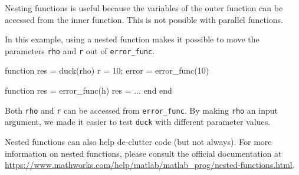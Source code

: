 \documentclass[
]{book}
\numberwithin{Answer}{chapter}
\numberwithin{Exercise}{chapter}
\begin{document}
\begin{appendices}
Nesting functions is useful because the variables of the outer
function can be accessed from the inner function.  This is not
possible with parallel functions.

In this example, using a nested function makes it possible to
move the parameters {\tt rho} and {\tt r} out of {\tt error\_func}.

\begin{code}
function res = duck(rho)
    r = 10;
    error = error_func(10)

    function res = error_func(h)
        res = ...
    end
end
\end{code}

Both {\tt rho} and {\tt r} can be accessed from {\tt error\_func}.
By making {\tt rho} an input argument, we made it easier to test
{\tt duck} with different parameter values.

Nested functions can also help de-clutter code (but not always). For
more information on nested functions, please consult the official documentation
at \url{https://www.mathworks.com/help/matlab/matlab_prog/nested-functions.html}.

\end{appendices}

\printindex
\end{document}
